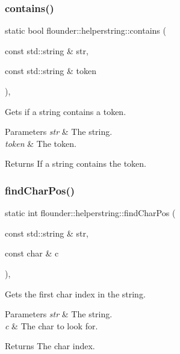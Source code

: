 \subsubsection{\texorpdfstring{contains()}{contains()}}
{\footnotesize\ttfamily static bool flounder\+::helperstring\+::contains (\begin{DoxyParamCaption}\item[{const std\+::string \&}]{str,  }\item[{const std\+::string \&}]{token }\end{DoxyParamCaption})\hspace{0.3cm}{\ttfamily [inline]}, {\ttfamily [static]}}



Gets if a string contains a token. 


\begin{DoxyParams}{Parameters}
{\em str} & The string. \\
\hline
{\em token} & The token. \\
\hline
\end{DoxyParams}
\begin{DoxyReturn}{Returns}
If a string contains the token. 
\end{DoxyReturn}
\mbox{\label{classflounder_1_1helperstring_a17e68d4de676fc161a693ebc874191d1}} 
\subsubsection{\texorpdfstring{find\+Char\+Pos()}{findCharPos()}}
{\footnotesize\ttfamily static int flounder\+::helperstring\+::find\+Char\+Pos (\begin{DoxyParamCaption}\item[{const std\+::string \&}]{str,  }\item[{const char \&}]{c }\end{DoxyParamCaption})\hspace{0.3cm}{\ttfamily [inline]}, {\ttfamily [static]}}



Gets the first char index in the string. 


\begin{DoxyParams}{Parameters}
{\em str} & The string. \\
\hline
{\em c} & The char to look for. \\
\hline
\end{DoxyParams}
\begin{DoxyReturn}{Returns}
The char index. 
\end{DoxyReturn}
\mbox{\label{classflounder_1_1helperstring_a91c95a1f719a7cf6211971b6d93b39ce}} 
